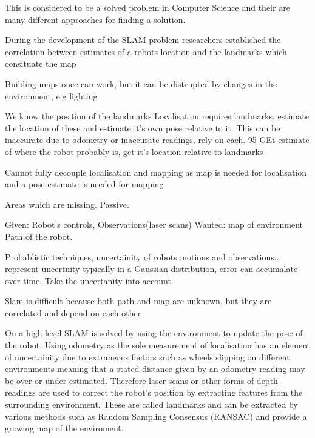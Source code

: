\documentclass{mproj}
\begin{document}
This is considered to be a solved problem in Computer Science and their are many different approaches for finding a solution. \cite{Hugh2006}



During the development of the SLAM problem researchers established the correlation between estimates of a robots location and the landmarks which consituate the map







Building maps once can work, but it can be distrupted by changes in the environment, e.g lighting 

We know the position of the landmarks
Localisation requires landmarks, estimate the location of these and estimate it's own pose relative to it. This can be inaccurate due to odometry or inaccurate readings, rely on each. 95%
GEt estimate of where the robot probably is, get it's location relative to landmarks

Cannot fully decouple localisation and mapping as map is needed for localisation and a pose estimate is needed for mapping

Areas which are missing. Passive.

Given: Robot's controls, Observations(laser scans)
Wanted: map of environment
Path of the robot.

Probablistic techniques, uncertainity of robots motions and observations... represent uncertnity typically in a Gaussian distribution, error can accumalate over time. Take the uncertanity into account.

Slam is difficult because both path and map are unknown, but they are correlated and depend on each other





On a high level SLAM is solved by using the environment to update the pose of the robot. Using odometry as the sole measurement of localisation has an element of uncertainity due to extraneous factors such as wheels slipping on different environments meaning that a stated distance given by an odometry reading may be over or under estimated. Therefore laser scans or other forms of depth readings are used to correct the robot's position by extracting features from the surrounding environment. These are called landmarks and can be extracted by various methods such as Random Sampling Consensus (RANSAC) and provide a growing map of the enviroment. 
\end{document}
